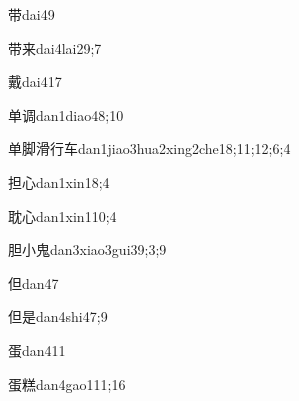 \begin{verbete}{带}{dai4}{9}
\end{verbete}

\begin{verbete}{带来}{dai4lai2}{9;7}
\end{verbete}

\begin{verbete}{戴}{dai4}{17}
\end{verbete}

\begin{verbete}{单调}{dan1diao4}{8;10}
\end{verbete}

\begin{verbete}{单脚滑行车}{dan1jiao3hua2xing2che1}{8;11;12;6;4}
\end{verbete}

\begin{verbete}{担心}{dan1xin1}{8;4}
\end{verbete}

\begin{verbete}{耽心}{dan1xin1}{10;4}
\end{verbete}

\begin{verbete}{胆小鬼}{dan3xiao3gui3}{9;3;9}
\end{verbete}

\begin{verbete}{但}{dan4}{7}
\end{verbete}

\begin{verbete}{但是}{dan4shi4}{7;9}
\end{verbete}

\begin{verbete}{蛋}{dan4}{11}
\end{verbete}

\begin{verbete}{蛋糕}{dan4gao1}{11;16}
\end{verbete}

